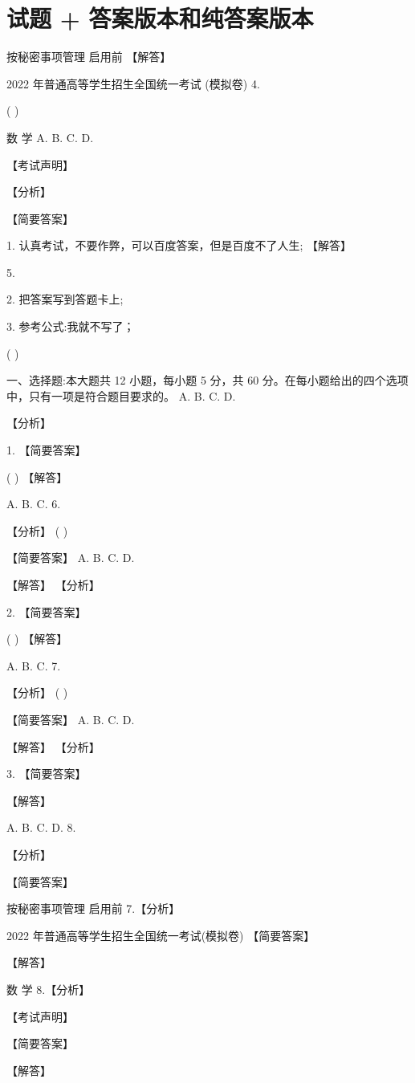 \documentclass[10pt]{article}
\begin{document}
\section*{试题 + 答案版本和纯答案版本}

按秘密事项管理  启用前 【解答】

2022 年普通高等学生招生全国统一考试 (模拟卷) 4.

( )

数 学 A. B. C. D.

【考试声明】

【分析】

【简要答案】

1. 认真考试，不要作弊，可以百度答案，但是百度不了人生; 【解答】

5.

2. 把答案写到答题卡上;

3. 参考公式:我就不写了；

( )

一、选择题:本大题共 12 小题，每小题 5 分，共 60 分。在每小题给出的四个选项中，只有一项是符合题目要求的。 A. B. C. D.

【分析】

1. 【简要答案】

( ) 【解答】

A. B. C. 6.

【分析】 ( )

【简要答案】 A. B. C. D.

【解答】 【分析】

2. 【简要答案】

( ) 【解答】

A. B. C. 7.

【分析】 ( )

【简要答案】 A. B. C. D.

【解答】 【分析】

3. 【简要答案】

【解答】

A. B. C. D. 8.

【分析】

【简要答案】

按秘密事项管理  启用前 7.【分析】

2022 年普通高等学生招生全国统一考试(模拟卷) 【简要答案】

【解答】

数 学 8.【分析】

【考试声明】

【简要答案】

【解答】
\end{document}
